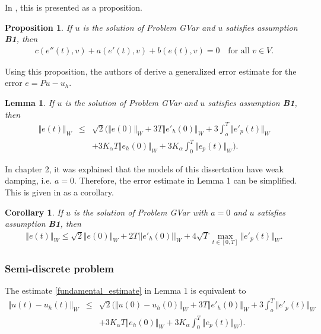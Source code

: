 \documentclass[../../main.tex]{subfiles}
\begin{document}
In \cite{BV13}, this is presented as a proposition.
\newtheorem{DC_Prop1}{Proposition}
\begin{DC_Prop1}
	If $u$ is the solution of Problem GVar and $u$ satisfies assumption \textbf{B1}, then
	\begin{eqnarray}
		c(e''(t),v) + a(e'(t),v) + b(e(t),v) = 0 \ \ \ \textrm{ for all } v \in V.
	\end{eqnarray}
\end{DC_Prop1}

Using this proposition, the authors of \cite{BV13} derive a generalized error estimate for the error $e = Pu - u_h$.

\newtheorem{lem_1}{Lemma}
\begin{lem_1}
	If $u$ is the solution of Problem GVar and $u$ satisfies assumption \textbf{B1}, then
	\begin{eqnarray}
		\Vert e(t)\Vert_{W} &\leq& \sqrt{2} \biggl( \Vert e(0) \Vert_W + 3T\Vert e'_h(0) \Vert_W + 3 \int_o^T \Vert e'_p(t)\Vert_W\nonumber \\
		&& + 3K_\alpha T \Vert e_h(0) \Vert_W + 3K_\alpha \int_0^T \Vert e_p(t) \Vert_W \biggr). \label{fundamental_estimate}
	\end{eqnarray}
\end{lem_1}

In chapter 2, it was explained that the models of this dissertation have weak damping, i.e. $a = 0$. Therefore, the error estimate in Lemma 1 can be simplified. This is given in \cite{BV13} as a corollary.

\newtheorem{col_1}{Corollary}
\begin{col_1}
	If $u$ is the solution of Problem GVar with $a = 0$ and $u$ satisfies assumption \textbf{B1}, then
	\begin{eqnarray}
		\Vert e(t)\Vert_{W} \leq \sqrt{2} \Vert e(0) \Vert_W + 2T||e'_h(0)||_W + 4\sqrt{T}\max_{t \in [0,T]} \Vert e'_p(t) \Vert_W.
	\end{eqnarray}
\end{col_1}

\subsubsection{Semi-discrete problem}
The estimate \eqref{fundamental_estimate} in Lemma 1 is equivalent to
\begin{eqnarray*}
	\Vert u(t) - u_h(t) \Vert_{W} &\leq& \sqrt{2} \biggl( \Vert u(0) - u_h(0) \Vert_W + 3T\Vert e'_h(0) \Vert_W + 3 \int_o^T \Vert e'_p(t)\Vert_W\nonumber \\
	&& + 3K_\alpha T \Vert e_h(0) \Vert_W + 3K_\alpha \int_0^T \Vert e_p(t) \Vert_W \biggr).
\end{eqnarray*}
\end{document}
